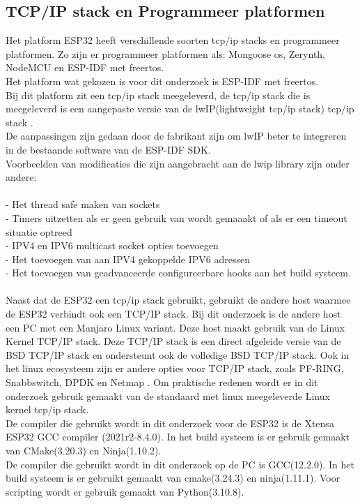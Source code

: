 \documentclass[../DCM2_Verslag.tex]{subfiles}
\begin{document}
\subsection{TCP/IP stack en Programmeer platformen}
Het platform ESP32 heeft verschillende soorten tcp/ip stacks en programmeer platformen. Zo zijn er programmeer platformen als: Mongoose os, Zerynth, NodeMCU en ESP-IDF met freertos.\\ Het platform wat gekozen is voor dit onderzoek is ESP-IDF met freertos. 
\\Bij dit platform zit een tcp/ip stack meegeleverd, de tcp/ip stack die is meegeleverd is een aangepaste versie van de lwIP(lightweight tcp/ip stack) tcp/ip stack \parencite{espressiflwip}. 
\\De aanpassingen zijn gedaan door de fabrikant zijn om lwIP beter te integreren in de bestaande software van de ESP-IDF SDK. 
\\Voorbeelden van modificaties die zijn aangebracht aan de lwip library zijn onder andere: \\\\
- Het thread safe maken van sockets\\
- Timers uitzetten als er geen gebruik van wordt gemaaakt of als er een timeout situatie optreed\\
- IPV4 en IPV6 multicast socket opties toevoegen\\
- Het toevoegen van aan IPV4 gekoppelde IPV6 adressen\\
- Het toevoegen van geadvanceerde configureerbare hooks aan het build systeem.\\\\
Naast dat de ESP32 een tcp/ip stack gebruikt, gebruikt de andere host waarmee de ESP32 verbindt ook een TCP/IP stack. Bij dit onderzoek is de andere host een PC met een Manjaro Linux variant. Deze host maakt gebruik van de Linux Kernel TCP/IP stack. Deze TCP/IP stack is een direct afgeleide versie van de BSD TCP/IP stack en ondersteunt ook de volledige BSD TCP/IP stack. Ook in het linux ecosysteem zijn er andere opties voor TCP/IP stack, zoals PF-RING, Snabbswitch, DPDK en Netmap \parencite{cloudflaretcpip}. Om praktische redenen wordt er in dit onderzoek gebruik gemaakt van de standaard met linux meegeleverde Linux kernel tcp/ip stack. \\
De compiler die gebruikt wordt in dit onderzoek voor de ESP32 is de Xtensa ESP32 GCC compiler (2021r2-8.4.0). In het build systeem is er gebruik gemaakt van CMake(3.20.3) en Ninja(1.10.2).\\
De compiler die gebruikt wordt in dit onderzoek op de PC is GCC(12.2.0). In het build systeem is er gebruikt gemaakt van cmake(3.24.3) en ninja(1.11.1). Voor scripting wordt er gebruik gemaakt van Python(3.10.8).\\
\end{document}
